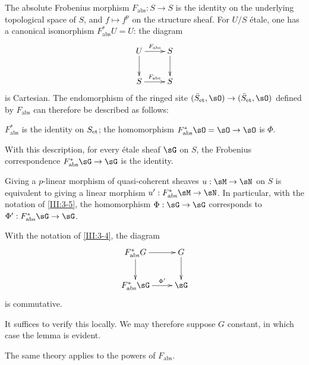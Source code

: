 The absolute Frobenius morphism $F_\text{abs}:S\to S$ is the identity on the
underlying topological space of $S$, and $f\mapsto f^p$ on the structure
sheaf. For $U/S$ étale, one has a canonical isomorphism
$F_\text{abs}^* U=U$: the diagram
\[\xymatrix{
  U \ar[r]^-{F_\text{abs}} \ar[d]
    & S \ar[d] \\
  S \ar[r]^-{F_\text{abs}}
    & S
}\]
is Cartesian. The endomorphism of the ringed site
$(\et{\bar S},\sO)\to(\et{\bar S},\sO)$ defined by $F_\text{abs}$ can
therefore be described as follows:
\begin{center}
  $F_\text{abs}^*$ is the identity on ${S}_{\textnormal{et}}$; the homomorphism
  $F_\text{abs}^*\sO=\sO\to\sO$ is $\Phi$.
\end{center}
With this description, for every étale sheaf $\sG$ on $S$, the Frobenius
correspondence $F_\text{abs}^*\sG\to\sG$ is the identity.

Giving a $p$-linear morphism of quasi-coherent sheaves
$u:\sM\to\sN$ on $S$ is equivalent to giving a linear morphism
$u':F_\text{abs}^*\sM\to\sN$. In particular, with the notation of
\ref{III:3-5}, the homomorphism $\Phi:\sG\to\sG$ corresponds to
$\Phi':F_\text{abs}^*\sG\to\sG$.






\begin{lemma_}\label{III:3-5}
With the notation of \ref{III:3-4}, the diagram
\[\xymatrix{
  F_\textnormal{abs}^* G \ar[r] \ar[d]
    & G \ar[d] \\
  F_\textnormal{abs}^*\sG \ar[r]^-{\Phi'}
    & \sG
}\]
is commutative.
\end{lemma_}

It suffices to verify this locally. We may therefore suppose $G$ constant, in
which case the lemma is evident.

The same theory applies to the powers of $F_\text{abs}$.






\subsection{}\label{III:3-6}

